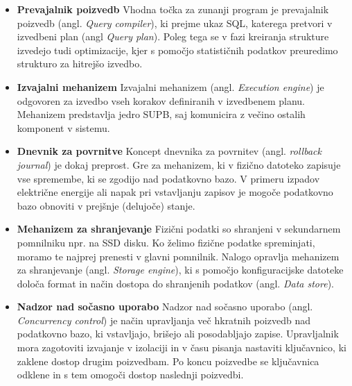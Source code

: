 \documentclass[a4paper,12pt,openright]{book}
\begin{document}
    \begin{itemize}
        \item \textbf{Prevajalnik poizvedb}\newline\noindent
        Vhodna točka za zunanji program je prevajalnik poizvedb (angl. \textit{Query compiler}), ki prejme ukaz SQL, katerega pretvori v izvedbeni plan (angl \textit{Query plan}). Poleg tega se v fazi kreiranja strukture izvedejo tudi optimizacije, kjer s pomočjo statističnih podatkov preuredimo strukturo za hitrejšo izvedbo.
        
        \item \textbf{Izvajalni mehanizem}\newline\noindent
        Izvajalni mehanizem (angl. \textit{Execution engine}) je odgovoren za izvedbo vseh korakov definiranih v izvedbenem planu. Mehanizem predstavlja jedro SUPB, saj komunicira z večino ostalih komponent v sistemu.
        
        \item \textbf{Dnevnik za povrnitve}\newline\noindent
        Koncept dnevnika za povrnitev (angl. \textit{rollback journal}) je dokaj preprost. Gre za mehanizem, ki v fizično datoteko zapisuje vse spremembe, ki se zgodijo nad podatkovno bazo. V primeru izpadov električne energije ali napak pri vstavljanju zapisov je mogoče podatkovno bazo obnoviti v prejšnje (delujoče) stanje.
        
        \item \textbf{Mehanizem za shranjevanje}\newline\noindent
        Fizični podatki so shranjeni v sekundarnem pomnilniku npr. na SSD disku. Ko želimo fizične podatke spreminjati, moramo te najprej prenesti v glavni pomnilnik. Nalogo opravlja mehanizem za shranjevanje (angl. \textit{Storage engine}), ki s pomočjo konfiguracijske datoteke določa format in način dostopa do shranjenih podatkov (angl. \textit{Data store}).
        
        \item \textbf{Nadzor nad sočasno uporabo}\newline\noindent
        Nadzor nad sočasno uporabo (angl. \textit{Concurrency control}) je način upravljanja več hkratnih poizvedb nad podatkovno bazo, ki vstavljajo, brišejo ali posodabljajo zapise. Upravljalnik mora zagotoviti izvajanje v izolaciji in v času pisanja nastaviti ključavnico, ki zaklene dostop drugim poizvedbam. Po koncu poizvedbe se ključavnica odklene in s tem omogoči dostop naslednji poizvedbi.
        
    \end{itemize}
\end{document}
